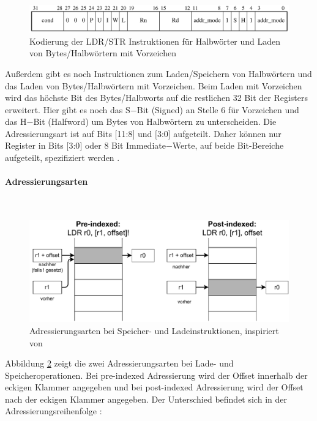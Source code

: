 \documentclass[a4paper, 11pt, onecolumn]{article}
\begin{document}
\begin{figure}[!htb]
\centering
\includegraphics[width=1\textwidth]{data/ldrstrh}
\caption{Kodierung der LDR/STR Instruktionen für Halbwörter und Laden von Bytes/Halbwörtern mit Vorzeichen \cite{ar}}
\label{fig:ldrstrh}
\end{figure}

Außerdem gibt es noch Instruktionen zum Laden/Speichern von Halbwörtern und das Laden von Bytes/Halbwörtern mit Vorzeichen. Beim Laden mit Vorzeichen wird das höchste Bit des Bytes/Halbworts auf die restlichen 32 Bit der Registers erweitert. Hier gibt es noch das S$-$Bit (Signed) an Stelle 6 für Vorzeichen und das H$-$Bit (Halfword) um Bytes von Halbwörtern zu unterscheiden. Die Adressierungsart ist auf Bits $[$11:8$]$ und $[$3:0$]$ aufgeteilt. Daher können nur Register in Bits $[$3:0$]$ oder 8 Bit Immediate$-$Werte, auf beide Bit-Bereiche aufgeteilt, spezifiziert werden \cite{arm:2005}.

\paragraph{Adressierungsarten}\label{sec:ldrstraddr}
~\\
\begin{figure}[!htb]
\centering
\includegraphics[width=1\textwidth]{data/offset}
\caption{Adressierungsarten bei Speicher- und Ladeinstruktionen, inspiriert von \cite{assembly}}
\label{fig:offset}
\end{figure}

Abbildung \ref{fig:offset} zeigt die zwei Adressierungsarten bei Lade- und Speicheroperationen. Bei pre-indexed Adressierung wird der Offset innerhalb der eckigen Klammer angegeben und bei post-indexed Adressierung wird der Offset nach der eckigen Klammer angegeben. Der Unterschied befindet sich in der Adressierungsreihenfolge \cite{arm:2005}:
\end{document}

